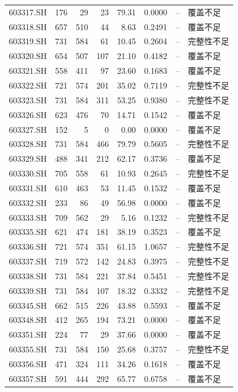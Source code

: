 \documentclass[10pt,a4paper]{article}
\begin{document}
\begin{longtable}{lrrr r r r l}
603317.SH & 176 & 29 & 23 & 79.31 & 0.0000 & -- & 覆盖不足\\
603318.SH & 657 & 510 & 44 & 8.63 & 0.2491 & -- & 覆盖不足\\
603319.SH & 731 & 584 & 61 & 10.45 & 0.2604 & -- & 完整性不足\\
603320.SH & 654 & 507 & 107 & 21.10 & 0.4182 & -- & 覆盖不足\\
603321.SH & 558 & 411 & 97 & 23.60 & 0.1683 & -- & 覆盖不足\\
603322.SH & 721 & 574 & 201 & 35.02 & 0.7119 & -- & 完整性不足\\
603323.SH & 731 & 584 & 311 & 53.25 & 0.9380 & -- & 完整性不足\\
603326.SH & 623 & 476 & 70 & 14.71 & 0.1542 & -- & 覆盖不足\\
603327.SH & 152 & 5 & 0 & 0.00 & 0.0000 & -- & 覆盖不足\\
603328.SH & 731 & 584 & 466 & 79.79 & 0.5605 & -- & 完整性不足\\
603329.SH & 488 & 341 & 212 & 62.17 & 0.3736 & -- & 覆盖不足\\
603330.SH & 705 & 558 & 61 & 10.93 & 0.2645 & -- & 完整性不足\\
603331.SH & 610 & 463 & 53 & 11.45 & 0.1532 & -- & 覆盖不足\\
603332.SH & 233 & 86 & 49 & 56.98 & 0.0000 & -- & 覆盖不足\\
603333.SH & 709 & 562 & 29 & 5.16 & 0.1232 & -- & 完整性不足\\
603335.SH & 621 & 474 & 181 & 38.19 & 0.3523 & -- & 覆盖不足\\
603336.SH & 721 & 574 & 351 & 61.15 & 1.0657 & -- & 完整性不足\\
603337.SH & 719 & 572 & 142 & 24.83 & 0.3975 & -- & 完整性不足\\
603338.SH & 731 & 584 & 221 & 37.84 & 0.5451 & -- & 完整性不足\\
603339.SH & 731 & 584 & 107 & 18.32 & 0.3332 & -- & 完整性不足\\
603345.SH & 662 & 515 & 226 & 43.88 & 0.5593 & -- & 覆盖不足\\
603348.SH & 412 & 265 & 194 & 73.21 & 0.0000 & -- & 覆盖不足\\
603351.SH & 224 & 77 & 29 & 37.66 & 0.0000 & -- & 覆盖不足\\
603355.SH & 731 & 584 & 150 & 25.68 & 0.3757 & -- & 完整性不足\\
603356.SH & 471 & 324 & 111 & 34.26 & 0.1618 & -- & 覆盖不足\\
603357.SH & 591 & 444 & 292 & 65.77 & 0.6758 & -- & 覆盖不足\\

\end{longtable}
\end{document}
